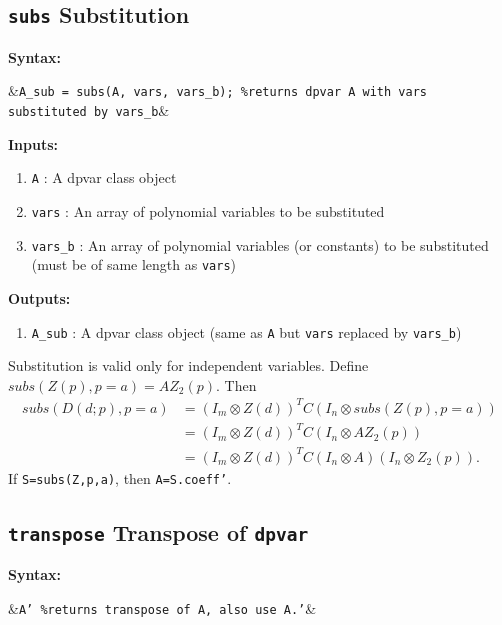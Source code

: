 \documentclass{article}
\begin{document}
	
	\subsection{\texttt{subs} Substitution}

	\textbf{Syntax:}	
		\begin{flalign*}
			&\texttt{A\_sub = subs(A, vars, vars\_b); \%returns dpvar A with vars substituted by vars\_b}&
		\end{flalign*}
	\textbf{Inputs:}
	\begin{enumerate}
		\item \texttt{A} : A dpvar class object
		\item \texttt{vars} : An array of polynomial variables to be substituted
		\item \texttt{vars\_b} : An array of polynomial variables (or constants) to be substituted (must be of same length as \texttt{vars})
	\end{enumerate}
	\textbf{Outputs:}
	\begin{enumerate}
		\item \texttt{A\_sub} : A dpvar class object (same as \texttt{A} but \texttt{vars} replaced by \texttt{vars\_b})
	\end{enumerate}

	Substitution is valid only for independent variables. Define $subs(Z(p),p=a)=A Z_2(p)$. Then
	\begin{align*}
		subs(D(d;p),p=a) &= (I_m \otimes  Z(d))^T C (I_n \otimes subs(Z(p),p=a))  \\
		&= (I_m \otimes  Z(d))^T C (I_n \otimes A Z_2(p))\\
		&= (I_m \otimes  Z(d))^T C (I_n \otimes A)(I_n \otimes Z_2(p)).
	\end{align*}
	If \texttt{S=subs(Z,p,a)}, then \texttt{A=S.coeff'}.
	
	\subsection{\texttt{transpose} Transpose of \texttt{dpvar}}
	\textbf{Syntax:}
		\begin{flalign*}
			&\texttt{A' \%returns transpose of A, also use A.'}&
		\end{flalign*}
\end{document}
